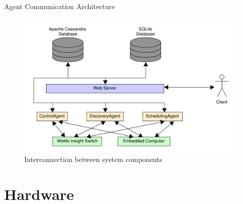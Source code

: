 \documentclass{beamer}
\begin{document}
\begin{frame}{Agent Communication Architecture}{}
    \begin{figure}
        \centering
        \includegraphics[scale=0.4]{figs/overallDiagram.pdf}
        \caption{Interconnection between system components}
        \label{fig:systemComponentInterconnection}
    \end{figure}
\end{frame}


\section{Hardware}
\end{document}
